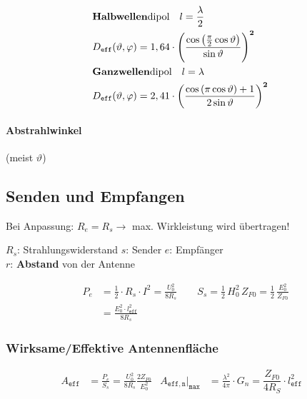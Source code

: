 \vspace{-0.5cm}
\begin{align*}
	                                                                                          & \text{\textbf{Halbwellen}dipol}\quad l=\frac{\lambda}{2} \\
	                                                                                          & D_{\texttt{eff}}(\vartheta, \varphi) = 1,64 \cdot
	\left(\frac{\cos\left(\frac{\pi}{2}\cos\vartheta\right)}{\sin\vartheta}\right)^\mathbf{2} &                                                          \\
	                                                                                          & \text{\textbf{Ganzwellen}dipol}\quad l=\lambda           \\ &D_{\texttt{eff}}(\vartheta, \varphi) = 2,41 \cdot
	\left(\frac{\cos\left(\pi\cos\vartheta\right)+1}{2\sin\vartheta}\right)^\mathbf{2}        &
\end{align*}

\paragraph{Abstrahlwinkel}
(meist $\vartheta$)\\



\subsection{Senden und Empfangen}
Bei Anpassung: $R_e = R_s \rightarrow$ max. Wirkleistung wird übertragen!


$ R_s $: Strahlungswiderstand \quad $ s $: Sender \qquad $ e $: Empfänger\\
$ r $: \textbf{Abstand} von der Antenne

\begin{align*}
	P_e & = \frac{1}{2}\cdot R_s \cdot I^2 = \frac{U_0^2}{8R_{s}} \qquad S_s = \frac{1}{2}\, H_0^2 \, Z_{F0} = \frac{1}{2} \, \frac{E_0^2}{Z_{F0}} \\
	    & = \frac{E_0^2\cdot l^2_{\mathtt{eff}}}{8R_{s}}
\end{align*}

\subsubsection{Wirksame/Effektive Antennenfläche}
\begin{align*}
	A_\texttt{eff} & = \frac{P_e}{S_s} = \frac{U_0^2}{8R_{s}}\frac{2Z_{F0}}{E_0^2}                  &
	A_{\mathtt{eff,n}}\Big|_{\mathtt{max}} & = \frac{\lambda^2}{4\pi}\cdot G_n = \dfrac{Z_{F0}}{4 R_S} \cdot l_\texttt{eff}^2 &
\end{align*}

